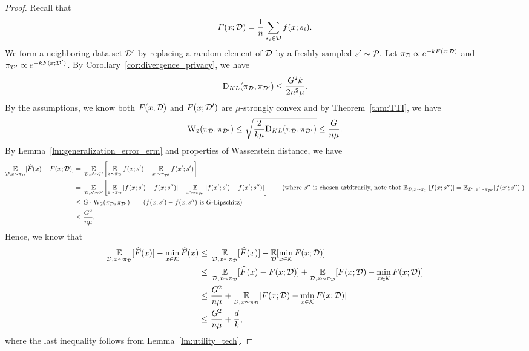 \begin{proof}
Recall that
\begin{align*}
    F(x;\mathcal D)=\frac{1}{n}\sum_{s_i\in\mathcal D}f(x;s_i).
\end{align*}
We form a neighboring data set $\mathcal D'$ by replacing a random element of $\mathcal D$ by a freshly sampled $s'\sim \mathcal P.$
Let $\pi_\mathcal D\propto e^{-kF(x;\mathcal D)}$ and $\pi_{\mathcal D'}\propto e^{-kF(x;\mathcal D')}$. By Corollary~\ref{cor:divergence_privacy}, we have
\begin{align*}
    \mathrm{D}_{KL}(\pi_\mathcal D,\pi_{\mathcal D'})\leq \frac{G^2k}{2n^2\mu}.
\end{align*}
By the assumptions, we know both $F(x;\mathcal D)$ and $F(x;\mathcal D')$ are $\mu$-strongly convex and by Theorem~\ref{thm:TTI}, we have
\begin{align*}
    \mathrm{W}_2(\pi_\mathcal D,\pi_{\mathcal D'})\leq \sqrt{\frac{2}{k\mu}\mathrm{D}_{KL}(\pi_\mathcal D,\pi_{\mathcal D'})} \leq \frac{G}{n\mu}.
\end{align*}
By Lemma~\ref{lm:generalization_error_erm} and properties of Wasserstein distance, we have
\begin{align*}
    \E_{\cD,x\sim \pi_{\cD}}[\HF(x)-F(x;\cD)]=&~\E_{\cD,s'\sim \cP}\lb\E_{x\sim \pi_\cD}f(x;s')-\E_{x'\sim \pi_{\cD'}}f(x';s')\rb\\
    =&~\E_{\cD,s'\sim \cP}\lb\E_{x\sim \pi_\cD}\lb f(x;s')-f(x;s'')\rb -\E_{x'\sim \pi_{\cD'}}\lb f(x';s')-f(x';s'')\rb \rb \tag{where $s''$ is chosen arbitrarily, note that $\E_{\cD,x\sim \pi_\cD}[f(x;s'')]=\E_{\cD',x'\sim \pi_{\cD'}}[f(x';s'')]$}\\
    \leq &~G\cdot \mathrm{W}_{2}(\pi_\cD,\pi_{\cD'}) \tag{$f(x;s')-f(x;s'')$ is $G$-Lipschitz}\\
    \leq &~ \frac{G^2}{n\mu}.
\end{align*}
Hence, we know that
\begin{align*}
    \operatorname*{\mathbb{E}}_{\mathcal D,x\sim\pi_{\mathcal D}}[\widehat{F}(x)]-\min_{x\in\mathcal K}\widehat{F}(x)\leq &~ \operatorname*{\mathbb{E}}_{\mathcal D,x\sim\pi_{\mathcal D}}[\widehat{F}(x)]-\operatorname*{\mathbb{E}}_{\mathcal D}[\min_{x\in\mathcal K}F(x;\mathcal D)]\\
    \leq &~ \operatorname*{\mathbb{E}}_{\mathcal D,x\sim\pi_{\mathcal D}}[\widehat{F}(x)-F(x;\mathcal D)]+\operatorname*{\mathbb{E}}_{\mathcal D,x\sim\pi_{\mathcal D}}[F(x;\mathcal D)-\min_{x\in\mathcal K}F(x;\mathcal D)]\\
    \leq &~ \frac{G^2}{n\mu}+\operatorname*{\mathbb{E}}_{\mathcal D,x\sim\pi_{\mathcal D}}[F(x;\mathcal D)-\min_{x\in\mathcal K}F(x;\mathcal D)]\\
    \leq &~ \frac{G^2}{n\mu}+\frac{d}{k},
\end{align*}
where the last inequality follows from Lemma~\ref{lm:utility_tech}.
\end{proof}

